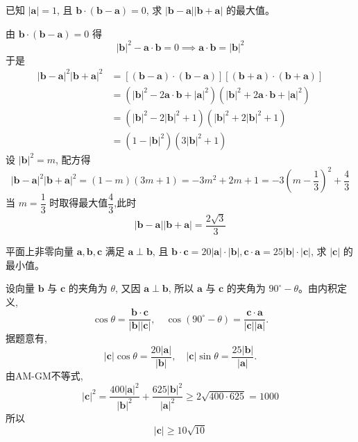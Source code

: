\begin{questions}
    \question 已知 $|\mathbf{a}|=1$, 且 $\mathbf{b}\cdot(\mathbf{b}-\mathbf{a})=0$, 求 $|\mathbf{b}-\mathbf{a}||\mathbf{b}+\mathbf{a}|$ 的最大值。
    \begin{solution}
        由 $\mathbf{b}\cdot(\mathbf{b}-\mathbf{a})=0$ 得
        \[
        |\mathbf{b}|^2 - \mathbf{a}\cdot \mathbf{b} = 0 \implies \mathbf{a}\cdot \mathbf{b} = |\mathbf{b}|^2
        \]
        于是
        \begin{align*}
        |\mathbf{b}-\mathbf{a}|^2|\mathbf{b}+\mathbf{a}|^2 
        &= [(\mathbf{b}-\mathbf{a})\cdot(\mathbf{b}-\mathbf{a})][(\mathbf{b}+\mathbf{a})\cdot(\mathbf{b}+\mathbf{a})] \\
        &= (|\mathbf{b}|^2 - 2 \mathbf{a}\cdot \mathbf{b} + |\mathbf{a}|^2)(|\mathbf{b}|^2 + 2 \mathbf{a}\cdot \mathbf{b} + |\mathbf{a}|^2) \\
        &= (|\mathbf{b}|^2 - 2|\mathbf{b}|^2 + 1)(|\mathbf{b}|^2 + 2|\mathbf{b}|^2 + 1) \\
        &= (1 - |\mathbf{b}|^2)(3|\mathbf{b}|^2 + 1)
        \end{align*}
        设 $|\mathbf{b}|^2 = m$, 配方得
        \[
        |\mathbf{b}-\mathbf{a}|^2|\mathbf{b}+\mathbf{a}|^2 = (1 - m)(3m + 1) = -3m^2 + 2m + 1 = -3\left(m - \frac{1}{3}\right)^2 + \frac{4}{3}
        \]
        当 $m = \dfrac{1}{3}$ 时取得最大值$\dfrac{4}{3}$,此时
        \[
        |\mathbf{b}-\mathbf{a}||\mathbf{b}+\mathbf{a}| = \frac{2\sqrt{3}}{3}
        \]
    \end{solution}

    \question 平面上非零向量 $\mathbf{a},\mathbf{b},\mathbf{c}$ 满足 $\mathbf{a}\perp\mathbf{b}$, 且 $\mathbf{b}\cdot\mathbf{c}=20|\mathbf{a}|\cdot|\mathbf{b}|,\mathbf{c}\cdot\mathbf{a}=25|\mathbf{b}|\cdot|\mathbf{c}|$, 求 $|\mathbf{c}|$ 的最小值。
    \begin{solution}
        设向量 $\mathbf{b}$ 与 $\mathbf{c}$ 的夹角为 $\theta$, 又因 $\mathbf{a}\perp\mathbf{b}$, 所以 $\mathbf{a}$ 与 $\mathbf{c}$ 的夹角为 $90^\circ-\theta$。由内积定义,
        \[
        \cos\theta=\frac{\mathbf{b}\cdot\mathbf{c}}{|\mathbf{b}||\mathbf{c}|},\quad
        \cos(90^\circ-\theta)=\frac{\mathbf{c}\cdot\mathbf{a}}{|\mathbf{c}||\mathbf{a}|}.
        \]
        据题意有,
        \[
        |\mathbf{c}|\cos\theta=\frac{20|\mathbf{a}|}{|\mathbf{b}|},\quad
        |\mathbf{c}|\sin\theta=\frac{25|\mathbf{b}|}{|\mathbf{a}|}.
        \]
        由AM-GM不等式,
        \[
        |\mathbf{c}|^2
        =\frac{400|\mathbf{a}|^2}{|\mathbf{b}|^2}
        +\frac{625|\mathbf{b}|^2}{|\mathbf{a}|^2}
        \ge 2\sqrt{400\cdot 625}=1000
        \]
        所以
        \[
        |\mathbf{c}|\ge 10\sqrt{10}
        \]
    \end{solution}
    

\end{questions}
